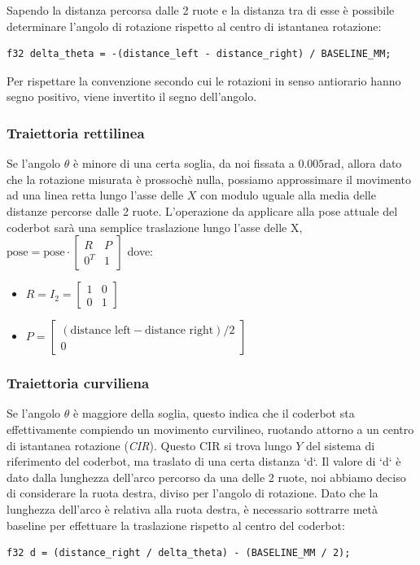 \documentclass[11pt]{article}
\begin{document}
Sapendo la distanza percorsa dalle 2 ruote e la distanza tra di esse è possibile determinare l'angolo di rotazione rispetto al centro di istantanea rotazione:
\begin{verbatim}
f32 delta_theta = -(distance_left - distance_right) / BASELINE_MM;
\end{verbatim}
Per rispettare la convenzione secondo cui le rotazioni in senso antiorario hanno segno positivo, viene invertito il segno dell'angolo.
\subsubsection{Traiettoria rettilinea}
\label{sec:org0898a64}
Se l'angolo \(\theta\) è minore di una certa soglia, da noi fissata a \(0.005\text{rad}\), allora dato che la rotazione misurata è prossochè nulla, possiamo approssimare il movimento ad una linea retta lungo l'asse delle \(X\) con modulo uguale alla media delle distanze percorse dalle 2 ruote.
L'operazione da applicare alla pose attuale del coderbot sarà una semplice traslazione lungo l'asse delle X, \(\text{pose}=\text{pose}\cdot\begin{bmatrix}R&P\\0^T&1\end{bmatrix}\) dove:
\begin{itemize}
\item \(R=I_2=\begin{bmatrix}1&0\\0&1\end{bmatrix}\)
\item \(P= \begin{bmatrix}(\text{distance left} - \text{distance right})/2\\0\end{bmatrix}\)
\end{itemize}
\subsubsection{Traiettoria curviliena}
\label{sec:orgd8c175a}
Se l'angolo \(\theta\) è maggiore della soglia, questo indica che il coderbot sta effettivamente compiendo un movimento curvilineo, ruotando attorno a un centro di istantanea rotazione (\emph{CIR}). Questo CIR si trova lungo \(Y\) del sistema di riferimento del coderbot, ma traslato di una certa distanza `d`.
Il valore di `d` è dato dalla lunghezza dell'arco percorso da una delle 2 ruote, noi abbiamo deciso di considerare la ruota destra, diviso per l'angolo di rotazione. Dato che la lunghezza dell'arco è relativa alla ruota destra, è necessario sottrarre metà baseline per effettuare la traslazione rispetto al centro del coderbot:
\begin{verbatim}
f32 d = (distance_right / delta_theta) - (BASELINE_MM / 2);
\end{verbatim}
\end{document}
